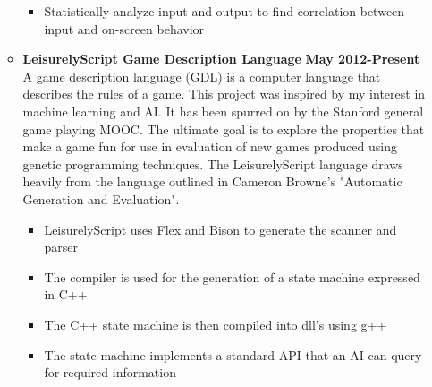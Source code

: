 \documentclass[overlapped]{res}
\begin{document}
\begin{resume}
\begin{itemize}[leftmargin=0in]
\begin{itemize}[leftmargin=0in]
\begin{samepage}
\begin{itemize}
                        \item[\textbullet] Statistically analyze input and output to find correlation between input and on-screen behavior
                    \end{itemize}
                \end{samepage}
            \item[] 
                \begin{samepage}
                    \textbf{LeisurelyScript Game Description Language} \hfill \textbf{May 2012-Present} \\
                    A game description language (GDL) is a computer language that describes the rules of a game. 
                    This project was inspired by my interest in machine learning and AI. It has been spurred on by the 
                    Stanford general game playing MOOC. The ultimate goal is to explore the properties that make a game
                    fun for use in evaluation of new games produced using genetic programming techniques. 
                    The LeisurelyScript language draws heavily from the language 
                    outlined in Cameron Browne's "Automatic Generation and Evaluation".
                    \begin{itemize}
                        \item[\textbullet] LeisurelyScript uses Flex and Bison to generate the scanner and parser
                        \item[\textbullet] The compiler is used for the generation of a state machine expressed in C++
                        \item[\textbullet] The C++ state machine is then compiled into dll's using g++
                        \item[\textbullet] The state machine implements a standard API that an AI can query for required information
                    \end{itemize}
                \end{samepage}
        \end{itemize}
\end{itemize}


\end{resume}
\end{document}
